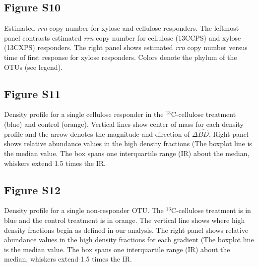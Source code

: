 \subsection{Figure S10}
Estimated \textit{rrn} copy number for xylose and cellulose responders. The leftmost panel contrasts estimated \textit{rrn} copy number for cellulose (13CCPS) and xylose (13CXPS) responders. The right panel shows estimated \textit{rrn} copy number versus time of first response for xylose responders. Colors denote the phylum of the OTUs (see legend).  \subsection{Figure S11}
Density profile for a single cellulose responder in the $^{13}$C-cellulose
treatment (blue) and control (orange). Vertical lines show center of mass for
each density profile and the arrow denotes the magnitude and direction of
$\Delta\hat{BD}$. Right panel shows relative abundance values in the high
density fractions (The boxplot line is the median value. The box spans one
interquartile range (IR) about the median, whiskers extend 1.5 times the IR.   

\subsection{Figure S12}
Density profile for a single non-responder OTU. The $^{13}$C-cellulose
treatment is in blue and the control treatment is in orange. The vertical line
shows where high density fractions begin as defined in our analysis. The right
panel shows relative abundance values in the high density fractions for each
gradient (The boxplot line is the median value. The box spans one
interquartile range (IR) about the median, whiskers extend 1.5 times the IR.  

